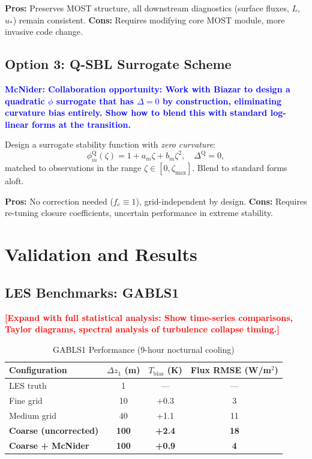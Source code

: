\documentclass[twocolumn,11pt]{article}
\newcommand{\TODO}[1]{\textcolor{red}{\textbf{[#1]}}}
\newcommand{\MCNIDER}[1]{\textcolor{blue}{\textbf{McNider: #1}}}
\begin{document}
\noindent \textbf{Pros:} Preserves MOST structure, all downstream diagnostics (surface fluxes, $L$, $u_*$) remain consistent.  
\noindent \textbf{Cons:} Requires modifying core MOST module, more invasive code change.

\subsection{Option 3: Q-SBL Surrogate Scheme}

\MCNIDER{Collaboration opportunity: Work with Biazar to design a quadratic $\phi$ surrogate that has $\Delta = 0$ by construction, eliminating curvature bias entirely. Show how to blend this with standard log-linear forms at the transition.}

Design a surrogate stability function with \textit{zero curvature}:
\begin{equation}
\phi_m^{\text{Q}}(\zeta) = 1 + a_m \zeta + b_m \zeta^2, \quad \Delta^{\text{Q}} = 0,
\end{equation}
matched to observations in the range $\zeta \in [0, \zeta_{\max}]$. Blend to standard forms aloft.

\noindent \textbf{Pros:} No correction needed ($f_c \equiv 1$), grid-independent by design.  
\noindent \textbf{Cons:} Requires re-tuning closure coefficients, uncertain performance in extreme stability.

\section{Validation and Results}
\label{sec:validation}

\subsection{LES Benchmarks: GABLS1}

\TODO{Expand with full statistical analysis: Show time-series comparisons, Taylor diagrams, spectral analysis of turbulence collapse timing.}

\begin{table}[h]
\centering
\caption{GABLS1 Performance (9-hour nocturnal cooling)}
\begin{tabular}{lccc}
\toprule
Configuration & $\Delta z_1$ (m) & $T_{\text{bias}}$ (K) & Flux RMSE (W/m$^2$) \\
\midrule
LES truth & 1 & --- & --- \\
Fine grid & 10 & +0.3 & 3 \\
Medium grid & 40 & +1.1 & 11 \\
\textbf{Coarse (uncorrected)} & \textbf{100} & \textbf{+2.4} & \textbf{18} \\
\textbf{Coarse + McNider} & \textbf{100} & \textbf{+0.9} & \textbf{4} \\
\bottomrule
\end{tabular}
\end{table}
\end{document}
